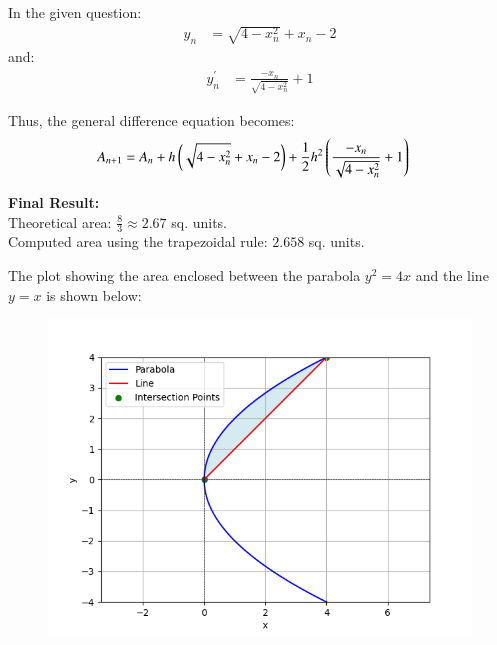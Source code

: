 \documentclass[journal]{IEEEtran}
\begin{document}
\begin{enumerate}
In the given question:
\begin{align}
y_n &= \sqrt{4 - x_n^2} + x_n - 2
\end{align}
and:
\begin{align}
y^{\prime}_n &= \frac{-x_n}{\sqrt{4 - x_n^2}} + 1
\end{align}

Thus, the general difference equation becomes:
\begin{align}
A_{n+1} &= A_n + h \left(\sqrt{4 - x_n^2} + x_n - 2\right) + \frac{1}{2} h^2 \left(\frac{-x_n}{\sqrt{4 - x_n^2}} + 1\right)
\end{align}

\textbf{Final Result:}\\
Theoretical area: $\frac{8}{3} \approx 2.67$ sq. units.\\
Computed area using the trapezoidal rule: $2.658$ sq. units.

The plot showing the area enclosed between the parabola $y^2 = 4x$ and the line $y=x$ is shown below:
\begin{figure}[H]
    \centering
    \includegraphics[width=\columnwidth]{figs/figure.png}
\end{figure}

\end{enumerate}
\end{document}

